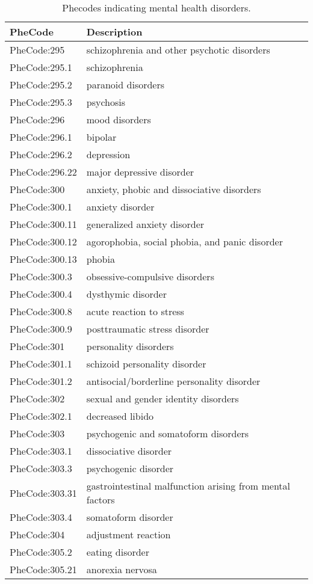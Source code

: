 \documentclass{article}
\begin{document}
\begin{table}[H]
\centering
\begin{tabular}{ll}
  \hline
PheCode & Description \\ 
  \hline
PheCode:295 & schizophrenia and other psychotic disorders \\ 
  PheCode:295.1 & schizophrenia \\ 
  PheCode:295.2 & paranoid disorders \\ 
  PheCode:295.3 & psychosis \\ 
  PheCode:296 & mood disorders \\ 
  PheCode:296.1 & bipolar \\ 
  PheCode:296.2 & depression \\ 
  PheCode:296.22 & major depressive disorder \\ 
  PheCode:300 & anxiety, phobic and dissociative disorders \\ 
  PheCode:300.1 & anxiety disorder \\ 
  PheCode:300.11 & generalized anxiety disorder \\ 
  PheCode:300.12 & agorophobia, social phobia, and panic disorder \\ 
  PheCode:300.13 & phobia \\ 
  PheCode:300.3 & obsessive-compulsive disorders \\ 
  PheCode:300.4 & dysthymic disorder \\ 
  PheCode:300.8 & acute reaction to stress \\ 
  PheCode:300.9 & posttraumatic stress disorder \\ 
  PheCode:301 & personality disorders \\ 
  PheCode:301.1 & schizoid personality disorder \\ 
  PheCode:301.2 & antisocial/borderline personality disorder \\ 
  PheCode:302 & sexual and gender identity disorders \\ 
  PheCode:302.1 & decreased libido \\ 
  PheCode:303 & psychogenic and somatoform disorders \\ 
  PheCode:303.1 & dissociative disorder \\ 
  PheCode:303.3 & psychogenic disorder \\ 
  PheCode:303.31 & gastrointestinal malfunction arising from mental factors \\ 
  PheCode:303.4 & somatoform disorder \\ 
  PheCode:304 & adjustment reaction \\ 
  PheCode:305.2 & eating disorder \\ 
  PheCode:305.21 & anorexia nervosa \\ 
   \hline
\end{tabular}
\caption{Phecodes indicating mental health disorders. }
\label{tab:mental_phecode}
\end{table}
\end{document}
